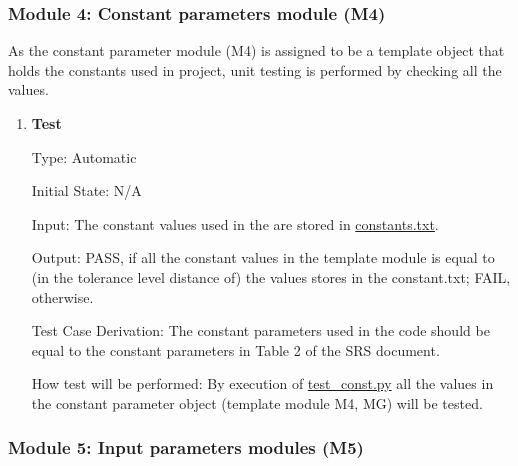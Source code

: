 \documentclass[12pt, titlepage]{article}
\begin{document}
\subsubsection{Module 4: Constant parameters module (M4)}


As the constant parameter module (M4) is assigned to be a template object that holds the constants used in project, unit testing is performed by checking all the values.

\begin{enumerate}

\item{\textbf{Test} \\}

Type: Automatic
					
Initial State: N/A
					
Input: The constant values used in the \progname{} are stored in  \href{https://github.com/shmouses/SPDFM/tree/master/src/constants.txt}{constants.txt}. 
					
Output: PASS, if all the constant values in the template module is equal to (in the tolerance level distance of) the values stores in the constant.txt; FAIL, otherwise.

Test Case Derivation: The constant parameters used in the code should be equal to the constant parameters in Table 2 of the SRS document.

How test will be performed:  By execution of  \href{https://github.com/shmouses/SPDFM/tree/master/src/test_const.py}{test\_const.py} all the values in the constant parameter object (template module M4, MG) will be tested. 
    
\end{enumerate}

\subsubsection{Module 5: Input parameters modules (M5)}
\end{document}
